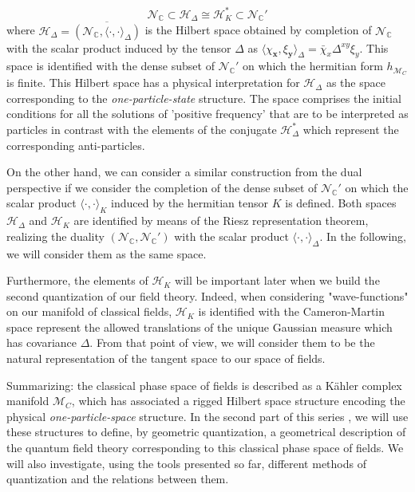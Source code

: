 \documentclass[12pt]{article}%
\begin{document}
\begin{equation}
\label{eq:HolomorphicTriple}
\mathcal{N}_{\mathbb{C}}\subset \mathcal{H}_\Delta\cong \mathcal{H}_K^*\subset {\mathcal{N}_{\mathbb{C}}'}
\end{equation}
 where $\mathcal{H}_\Delta=\overline{(\mathcal{N}_{\mathbb{C}},\langle \cdot,\cdot\rangle_\Delta)}$ is the  Hilbert space obtained by completion of $\mathcal{N}_{\mathbb{C}}$ with the scalar product induced by  the tensor $\Delta$ as $\langle \chi_{\mathbf{x}},\xi_{\mathbf{y}}\rangle_\Delta=\bar{\chi}_x\Delta^{xy}\xi_y$.  This space is identified with the dense subset of $\mathcal{N}_{\mathbb{C}}'$ on which the hermitian form $h_{\mathcal{M}_C}$ is finite. This Hilbert space  has a physical interpretation for $\mathcal{H}_\Delta$ as the space corresponding to the \textit{one-particle-state} structure. The space comprises the initial conditions for all the solutions of 'positive frequency' that are to be interpreted as particles in contrast with the elements of the conjugate $\mathcal{H}_{\Delta}^*$ which represent the corresponding anti-particles.    

On the other hand, we can consider a similar construction from the dual perspective if we consider the completion of  the dense subset of $\mathcal{N}_{\mathbb{C}}'$ on which the scalar product $\langle \cdot,\cdot\rangle_K$ induced by the hermitian tensor $K$ is defined.  Both spaces $\mathcal{H}_\Delta$ and $\mathcal{H}_K$ are identified by means of the Riesz representation theorem,  realizing the duality  $(\mathcal{N}_{\mathbb{C}},\mathcal{N}_{\mathbb{C}}')$ with the scalar product  $\langle \cdot,\cdot\rangle_\Delta$.  In the following, we will consider them as the same space.

Furthermore, the elements of $\mathcal{H}_K$ will be important later when we build the second quantization of our field theory. Indeed, when considering "wave-functions" on our manifold of classical fields, $\mathcal{H}_K$ is identified with the Cameron-Martin space represent the allowed translations of the unique Gaussian measure which has covariance $\Delta$. From that point of view, we will consider them to be the natural representation of the tangent space to our space of fields.

Summarizing: the classical phase space of fields is described as a Kähler complex manifold $\mathcal{M}_C$, which has associated a rigged Hilbert space structure encoding the physical \textit{one-particle-space} structure. In the second part of this series \cite{alonso2023a}, we will use these structures to define, by geometric quantization, a geometrical description of the quantum field theory corresponding to this  classical phase space of fields. We will also investigate, using the tools presented so far, different methods of quantization and the relations between them.
\end{document}
